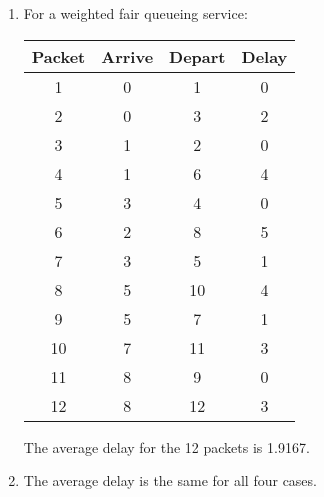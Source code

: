 \documentclass{article}
\begin{document}
\begin{enumerate}
\begin{enumerate}
\item For a weighted fair queueing service:

\begin{tabular}{|c|c|c|c|}
    \hline
    Packet & Arrive & Depart & Delay \\
    \hline
    1 & 0 & 1 & 0 \\ \hline
    2 & 0 & 3 & 2 \\ \hline
    3 & 1 & 2 & 0 \\ \hline
    4 & 1 & 6 & 4 \\ \hline
    5 & 3 & 4 & 0 \\ \hline
    6 & 2 & 8 & 5 \\ \hline
    7 & 3 & 5 & 1 \\ \hline
    8 & 5 & 10 & 4 \\ \hline
    9 & 5 & 7 & 1 \\ \hline
    10 & 7 & 11 & 3 \\ \hline
    11 & 8 & 9 & 0 \\ \hline
    12 & 8 & 12 & 3 \\ \hline
\end{tabular}

The average delay for the 12 packets is 1.9167.

\item The average delay is the same for all four cases.
\end{enumerate}

\end{enumerate}
\end{document}
